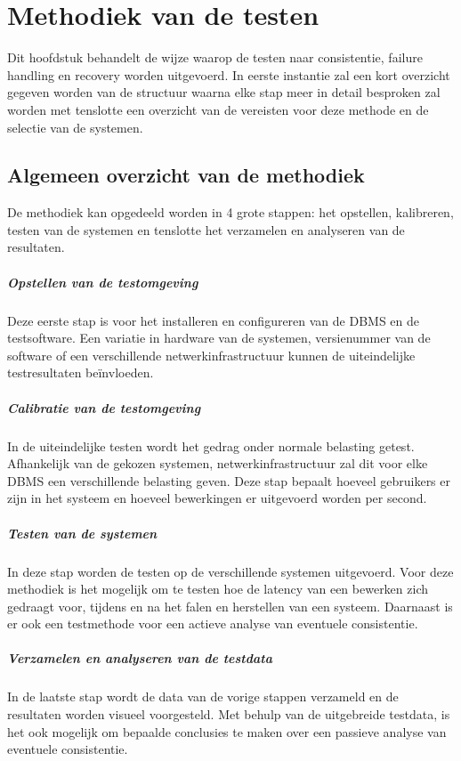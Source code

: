 \chapter{Methodiek van de testen}	
Dit hoofdstuk behandelt de wijze waarop de testen naar consistentie, failure handling en recovery worden uitgevoerd. In eerste instantie zal een kort overzicht gegeven worden van de structuur waarna elke stap meer in detail besproken zal worden met tenslotte een overzicht van de vereisten voor deze methode en de selectie van de systemen.   

\section{Algemeen overzicht van de methodiek}
De methodiek kan opgedeeld worden in 4 grote stappen: het opstellen, kalibreren, testen van de systemen en tenslotte het verzamelen en analyseren van de resultaten.

\paragraph{Opstellen van de testomgeving} Deze eerste stap is voor het installeren en configureren van de DBMS en de testsoftware. Een variatie in hardware van de systemen, versienummer van de software of een verschillende netwerkinfrastructuur kunnen de uiteindelijke testresultaten beïnvloeden. 

\paragraph{Calibratie van de testomgeving} In de uiteindelijke testen wordt het gedrag onder normale belasting getest. Afhankelijk van de gekozen systemen, netwerkinfrastructuur zal dit voor elke DBMS een verschillende belasting geven. Deze stap bepaalt hoeveel gebruikers er zijn in het systeem en hoeveel bewerkingen er uitgevoerd worden per second. 

\paragraph{Testen van de systemen} In deze stap worden de testen op de verschillende systemen uitgevoerd. Voor deze methodiek is het mogelijk om te testen hoe de latency van een bewerken zich gedraagt voor, tijdens en na het falen en herstellen van een systeem.  Daarnaast is er ook een testmethode voor een actieve analyse van eventuele consistentie. 

\paragraph{Verzamelen en analyseren van de testdata} In de laatste stap wordt de data van de vorige stappen verzameld en de resultaten worden visueel voorgesteld. Met behulp van de uitgebreide testdata, is het ook mogelijk om bepaalde conclusies te maken over een passieve analyse van eventuele consistentie. 

